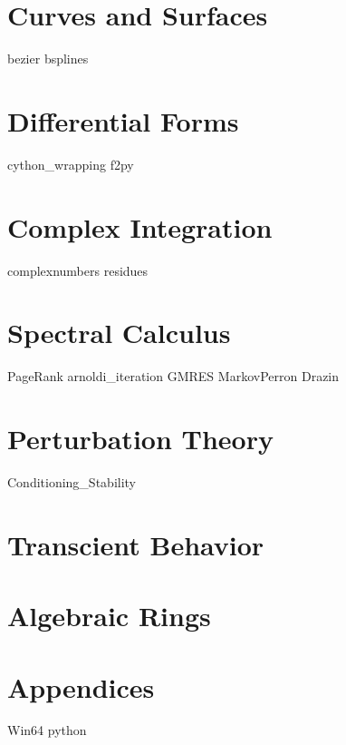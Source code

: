 \documentclass[nociteref]{SIAM-GH-book}
\begin{document}
\part{Curves and Surfaces}
{bezier}
{bsplines}

\part{Differential Forms}
{cython_wrapping}
{f2py}

\part{Complex Integration}
{complexnumbers}
{residues}

\part{Spectral Calculus}
{PageRank}
{arnoldi_iteration}
{GMRES}
{MarkovPerron}
{Drazin}

\part{Perturbation Theory}
{Conditioning_Stability}

\part{Transcient Behavior}

\part{Algebraic Rings}

\part{Appendices}
{Win64}
{python}
\end{document}
